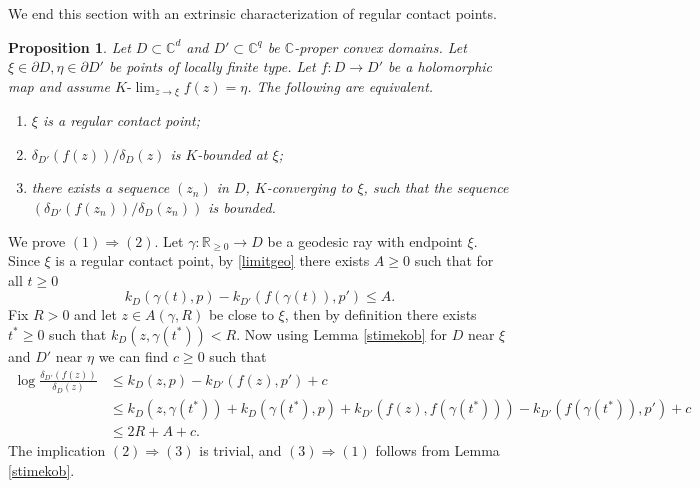 \documentclass[11pt, reqno]{amsart}
\numberwithin{equation}{section}
\newtheorem{proposition}[theorem]{Proposition}
\theoremstyle{definition}
\newcommand{\C}{\mathbb{C}}
\newcommand{\R}{\mathbb{R}}
\begin{document}
{{{		
		
		We end this section with an extrinsic characterization of regular contact points.
		
		
		\begin{proposition}\label{ratiodeltas}Let $D\subset\C^d$ and $D'\subset\C^{q}$ be  $\C$-proper convex domains. Let $\xi\in\partial D,\eta\in \partial D'$ be points of locally finite type. Let $f\colon D\to D'$ be a holomorphic map and  assume  $K\textrm{-}\lim_{z\to\xi}f(z)=\eta$.
			The following are equivalent.
			\begin{enumerate}
				\item $\xi$ is a regular contact point;
				\item  $\delta_{D'}(f(z))/\delta_D(z)$ is $K$-bounded at $\xi$;
				\item there exists a sequence $(z_n)$ in $D$, $K$-converging to $\xi$, such that 
				the sequence $(\delta_{D'}(f(z_n))/\delta_D(z_n))$ is bounded.
			\end{enumerate}
		\end{proposition}
		\proof We prove $(1)\Rightarrow (2)$. Let $\gamma\colon\R_{\geq 0}\to D$ be a geodesic ray with endpoint $\xi$. Since $\xi$ is a regular contact point, by \eqref{limitgeo} there exists $A\geq 0$ such that for all $t\geq0$
		$$k_D(\gamma(t),p)-k_{D'}(f(\gamma(t)),p')\leq A.$$ Fix $R>0$ and let $z\in A(\gamma,R)$ be close to $\xi$, then by definition there exists $t^*\geq 0$ such that $k_D(z,\gamma(t^*))<R$. Now using Lemma \ref{stimekob} for $D$ near $\xi$ and $D'$ near $\eta$ we can find $c\geq 0$ such that
		\begin{align*}
			\log\frac{\delta_{D'}(f(z))}{\delta_D(z)}&\leq k_D(z,p)-k_{D'}(f(z),p')+c
			\\&\leq k_D(z,\gamma(t^*))+k_D(\gamma(t^*),p)+k_{D'}(f(z),f(\gamma(t^*)))-k_{D'}(f(\gamma(t^*)),p')+c
			\\&\leq 2R+A+c.
		\end{align*}
		The implication $(2)\Rightarrow(3)$ is trivial, and 
		$(3)\Rightarrow(1)$ follows from Lemma \ref{stimekob}.
		\endproof
		
}}}
\end{document}
